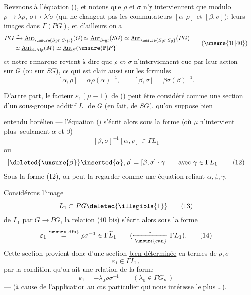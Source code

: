 Revenons à l'équation (), et notons que $\rho$ et $\sigma$ n'y interviennent que modulo  $\rho\mapsto\lambda\rho$, $\sigma\mapsto\lambda'\sigma$  (qui ne changent pas les commutateurs $[\alpha,\rho]$ et $[\beta,\sigma]$);    leurs images dans $\Gamma(PG)$, et d'ailleurs on a
\[
\begin{aligned}
PG&\xrightarrow{\sim}\underline{\mathrm{Aut}}_{\unsure{Sgr|S\text{-gr}}}(G)
\simeq\underline{\mathrm{Aut}}_{S\text{-gr}}(SG)
\simeq\underline{\mathrm{Aut}}_{\unsure{Sgr|Sg}}(PG)\\
&\simeq\underline{\mathrm{Aut}}_{S\text{-Alg}}(M)
\simeq\underline{\mathrm{Aut}}_S(\unsure{\mathbb P|P})
\end{aligned} \tag{\unsure{10|40}}
\]
et notre remarque revient à dire que $\rho$ et $\sigma$ n'interviennent que par leur action sur $G$ (ou sur $SG$), ce qui est clair aussi sur les formules
\[
[\alpha,\rho]=\alpha\rho(\alpha)^{-1},\qquad
[\beta,\sigma]=\beta\sigma(\beta)^{-1}.
\]

D'autre part, le facteur $\varepsilon_1(\mu-1)$ de () peut être considéré comme une section d'un  sous-groupe additif $L_1$ de $G$ (en fait, de $SG$), qu'on suppose bien


entendu borélien --- l'équation () s'écrit alors sous la forme (où $\mu$ n'intervient plus, seulement $\alpha$ et $\beta$)
\[
[\beta,\sigma]^{-1}[\alpha,\rho]\in\Gamma L_1 \tag{11}
\]
ou
\[
[\deleted{\unsure{\beta}}\inserted{\alpha},\rho]=[\beta,\sigma]\cdot\gamma
\qquad\text{avec }\gamma\in\Gamma L_1. \tag{12}
\]
Sous la forme (12), on peut la regarder comme une équation reliant $\alpha,\beta,\gamma$.

Considérons l'image 
\[
\widetilde L_1\subset PG\deleted{\illegible{1}} \tag{13}
\]
de $L_1$ par $G\longrightarrow PG$, la relation (40 bis) s'écrit alors sous la forme
\[
\widetilde\varepsilon_1\overset{\unsure{\mathrm{dfn}}}{=}
\widetilde\rho\widetilde\sigma^{-1}\in\Gamma\widetilde L_1
\qquad(\xleftarrow[\unsure{\mathrm{can}}]{\sim}\Gamma L_1). \tag{14}
\]
Cette section provient donc d'une section \uline{bien déterminée}  en termes de $\widetilde\rho,\widetilde\sigma$
\[
\varepsilon_1\in\Gamma L_1, \tag{15}
\]
 par la condition qu'on ait une relation de la forme
\[
\varepsilon_1=-\lambda_0\rho\sigma^{-1}
\qquad(\lambda_0\in\Gamma G_m) \tag*{(16) = (40 bis)}
\]
 --- (à cause de l'application au cas particulier qui nous intéresse le plus \ldots).

